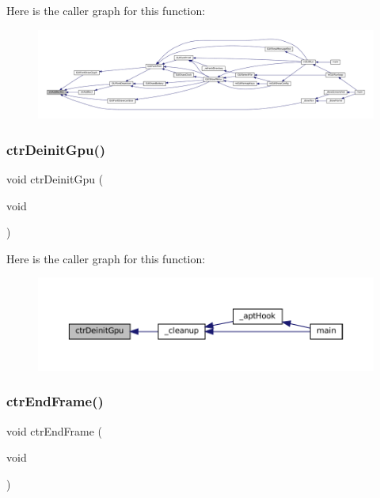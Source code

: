 Here is the caller graph for this function\+:
\nopagebreak
\begin{figure}[H]
\begin{center}
\leavevmode
\includegraphics[width=350pt]{ctr-gpu_8c_aa59622aca4a180cff8a77bbc0397f4de_icgraph}
\end{center}
\end{figure}
\mbox{\label{ctr-gpu_8c_a351de94984c7d5ffca8dd11c840f0da1}} 
\subsubsection{\texorpdfstring{ctr\+Deinit\+Gpu()}{ctrDeinitGpu()}}
{\footnotesize\ttfamily void ctr\+Deinit\+Gpu (\begin{DoxyParamCaption}\item[{void}]{ }\end{DoxyParamCaption})}

Here is the caller graph for this function\+:
\nopagebreak
\begin{figure}[H]
\begin{center}
\leavevmode
\includegraphics[width=350pt]{ctr-gpu_8c_a351de94984c7d5ffca8dd11c840f0da1_icgraph}
\end{center}
\end{figure}
\mbox{\label{ctr-gpu_8c_afde5ab22c1fe022b58bee18e06dfa89e}} 
\subsubsection{\texorpdfstring{ctr\+End\+Frame()}{ctrEndFrame()}}
{\footnotesize\ttfamily void ctr\+End\+Frame (\begin{DoxyParamCaption}\item[{void}]{ }\end{DoxyParamCaption})}

